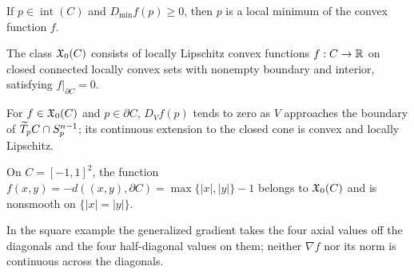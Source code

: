 \begin{lemma}
\label{lem:chow-iii-h31-critical-local-minimum}
If $p\in\operatorname{int}(C)$ and $D_{\min}f(p)\ge0$, then $p$ is a local minimum
of the convex function $f$.
\end{lemma}

\begin{definition}
\label{def:chow-iii-h32-Xzero}
The class $\mathfrak X_0(C)$ consists of locally Lipschitz convex functions $f:C\to\mathbb R$ on
closed connected locally convex sets with nonempty boundary and interior, satisfying
$f|_{\partial C}=0$.
\end{definition}

\begin{lemma}
\label{lem:chow-iii-h33-boundary-directional-extension}
For $f\in\mathfrak X_0(C)$ and $p\in\partial C$, $D_Vf(p)$ tends to zero as $V$ approaches
the boundary of $\widetilde T_pC\cap S_p^{n-1}$; its continuous extension to the closed cone is
convex and locally Lipschitz.
\end{lemma}

\begin{example}
\label{ex:chow-iii-h34-square-convex-function}
On $C=[-1,1]^2$, the function $f(x,y)=-d((x,y),\partial C)=\max\{|x|,|y|\}-1$
belongs to $\mathfrak X_0(C)$ and is nonsmooth on $\{|x|=|y|\}$.
\end{example}

\begin{remark}
\label{rem:chow-iii-h35-square-gradient}
In the square example the generalized gradient takes the four axial values off the
diagonals and the four half-diagonal values on them; neither $\nabla f$ nor its norm
is continuous across the diagonals.
\end{remark}

